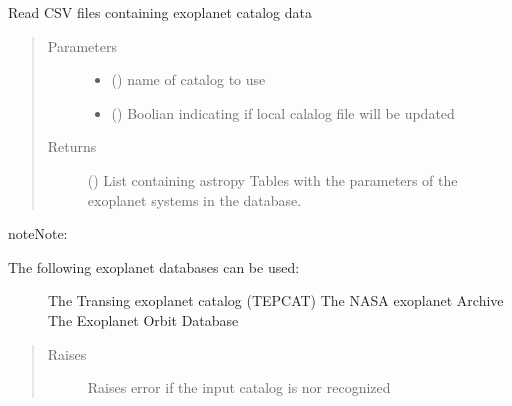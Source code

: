 \documentclass[a4paper,10pt,english]{sphinxmanual}
\begin{document}
\begin{fulllineitems}
\label{\detokenize{cascade.exoplanet_tools:cascade.exoplanet_tools.exoplanet_tools.parse_database}}
Read CSV files containing exoplanet catalog data
\begin{quote}\begin{description}
\item[{Parameters}] \leavevmode\begin{itemize}
\item {} 
 () \textendash{} name of catalog to use

\item {} 
 () \textendash{} Boolian indicating if local calalog file will be updated

\end{itemize}

\item[{Returns}] \leavevmode
{} () \textendash{} List containing astropy Tables with the parameters of the exoplanet
systems in the database.

\end{description}\end{quote}

\begin{sphinxadmonition}{note}{Note:}\begin{description}
\item[{The following exoplanet databases can be used:}] \leavevmode
The Transing exoplanet catalog (TEPCAT)
The NASA exoplanet Archive
The Exoplanet Orbit Database

\end{description}
\end{sphinxadmonition}
\begin{quote}\begin{description}
\item[{Raises}] \leavevmode
{} \textendash{} Raises error if the input catalog is nor recognized

\end{description}\end{quote}

\end{fulllineitems}
\end{document}
